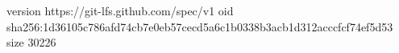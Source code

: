 version https://git-lfs.github.com/spec/v1
oid sha256:1d36105c786afd74cb7e0eb57cecd5a6c1b0338b3acb1d312acccfcf74ef5d53
size 30226

